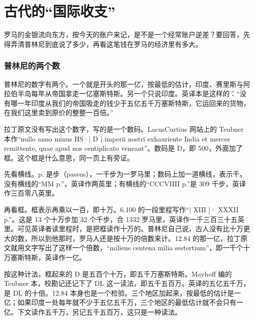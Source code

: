 \section{古代的“国际收支”}\label{sec:india-bop}

罗马的金银流向东方，按今天的账户来记，是不是一个经常账户逆差？要回答，先得弄清普林尼到底说了多少，再看这笔钱在罗马的经济里有多大。

\subsubsection{普林尼的两个数}
普林尼的数字有两个。一个就是开头的那一亿，按最低的估计，印度、赛里斯与阿拉伯半岛每年从帝国拿走一亿塞斯特斯\cite{pliny}。另一个只说印度。英译本是这样的：“没有哪一年印度从我们的帝国吸走的钱少于五亿五千万塞斯特斯，它运回来的货物，在我们这里卖到原价的整整一百倍。”\cite{pliny}

拉丁原文没有写出这个数字，写的是一个数码。LacusCurtius 网站上的 Teubner 本作“nullo anno minus HS·| D | imperii nostri exhauriente India et merces remittente, quae apud nos centiplicato veneant”\cite{pliny}。数码是 D，即 500，外面加了框。这个框是什么意思，同一页上有旁证。

先看横线。p. 是步（passus），一千步为一罗马里；数码上加一道横线，表示千。没有横线的“MM p.”，英译作两英里；有横线的“CCCVIIII p.”是 309 千步，英译作三百零八英里。

再看框。框表示再乘以一百，即十万。6.100 的一段里程写作“| XIII |· XXXII p.”。这是 13 个十万步加 32 个千步，合 1332 罗马里，英译作一千三百三十五英里。可见英译者读里程时，是把框读作十万的。普林尼自己说，古人没有比十万更大的数，所以到他那时，罗马人还是按十万的倍数来计。12.84 的那一亿，拉丁原文就用文字写出了这样一个倍数，“miliens centena milia sestertium”，即一千个十万塞斯特斯，英译作一亿\cite{pliny}。

按这种计法，框起来的 D 是五百个十万，即五千万塞斯特斯。Mayhoff 编的 Teubner 本，校勘记还记下了 DL 这一读法\cite{pliny}，即五千五百万。英译的五亿五千万，是 DL 的十倍。12.84 本身也是一个检验。三个地区加起来，按最低的估计是一亿；如果印度一处每年就不少于五亿五千万，三个地区的最低估计就不会只有一亿。下文读作五千万，另记五千五百万，这只是一种读法。

